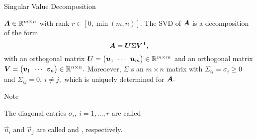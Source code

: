 \documentclass[handout,fleqn,aspectratio=169]{beamer}
\begin{document}
\begin{frame}{Singular Value Decomposition}

\plitemsep 0.1in

\bci 
\item \thm $\bm{A} \in {\mathbb R}^{m \times n}$ with rank $r \in [0,\min(m,n)].$ The SVD of $\bm{A}$ is a decomposition of the form 
{
$$
\bm{A} = \bm{U} \Sigma {\bm{V}}^{\mathsf{T}},
$$
}
{
\vspace{-0.3cm}
}
with an orthogonal matrix $\mU=\rowvec{\vec{u}_1 &\cdots &\vec{u}_m } \in \realmm$ and an orthogonal matrix $\mV=\rowvec{\vec{v}_1 &\cdots &\vec{v}_n} \in \realnn.$ Moreoever, $\Sigma$ s an $m \times n$ matrix with $\Sigma_{ii} = \sigma_i \ge 0$ and $\Sigma_{ij} =0, \ i\neq j,$ which is uniquely determined for $\bm{A}.$

\medskip
\item Note
\bci
\item The diagonal entries $\sigma_i, \ i=1,\ldots, r$ are called    
\item $\vec{u}_i$ and $\vec{v}_j$ are called  and , respectively. 
\eci
\eci
\end{frame}
\end{document}
